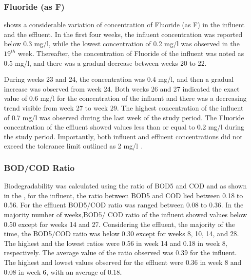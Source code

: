 \subsubsection{Fluoride (as F)}
 shows a considerable variation of concentration of Fluoride (as F) in the influent and the effluent. In the first four weeks, the influent concentration was reported below 0.3 mg/l, while the lowest concentration of 0.2 mg/l was observed in the $19^{th}$ week.  Thereafter, the concentration of Fluoride of the influent was noted as 0.5 mg/l, and there was a gradual decrease between weeks 20 to 22.

During weeks 23 and 24, the concentration was 0.4 mg/l, and then a gradual increase was observed from week 24. Both weeks 26 and 27 indicated the exact value of 0.6 mg/l for the concentration of the influent and there was a decreasing trend visible from week 27 to week 29.  The highest concentration of the influent of 0.7 mg/l was observed during the last week of the study period. The Fluoride concentration of the effluent showed values less than or equal to 0.2 mg/l during the study period. Importantly, both influent and effluent concentrations did not exceed the tolerance limit outlined as 2 mg/l \cite{CEA2022}.





\subsubsection{BOD/COD Ratio}
Biodegradability was calculated using the ratio of \ac{BOD5} and \ac{COD} and as shown in the , for the influent, the ratio between \ac{BOD5} and \ac{COD} lied between 0.18 to 0.56. For the effluent \ac{BOD5}/\ac{COD} ratio was ranged between 0.08 to 0.36. In the majority number of weeks,\ac{BOD5}/ \ac{COD} ratio of the influent showed values below 0.50 except for weeks 14 and 27. Considering the effluent, the majority of the time, the \ac{BOD5}/\ac{COD} ratio was below 0.30 except for weeks 8, 10, 14, and 28. The highest and the lowest ratios were 0.56 in week 14 and 0.18 in week 8, respectively. The average value of the ratio observed was 0.39 for the influent. The highest and lowest values observed for the effluent were 0.36 in week 8 and 0.08 in week 6, with an average of 0.18. 


